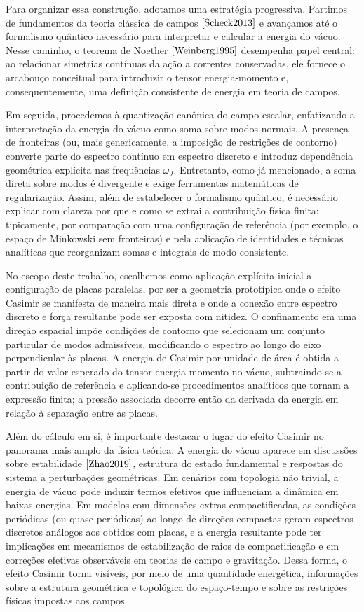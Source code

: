 Para organizar essa construção, adotamos uma estratégia progressiva. Partimos de fundamentos da teoria clássica de campos $\cite{Scheck2013}$ e avançamos até o formalismo quântico necessário para interpretar e calcular a energia do vácuo. Nesse caminho, o teorema de Noether $\cite{Weinberg1995}$ desempenha papel central: ao relacionar simetrias contínuas da ação a correntes conservadas, ele fornece o arcabouço conceitual para introduzir o tensor energia-momento e, consequentemente, uma definição consistente de energia em teoria de campos.

Em seguida, procedemos à quantização canônica do campo escalar, enfatizando a interpretação da energia do vácuo como soma sobre modos normais. A presença de fronteiras (ou, mais genericamente, a imposição de restrições de contorno) converte parte do espectro contínuo em espectro discreto e introduz dependência geométrica explícita nas frequências $\omega_J$. Entretanto, como já mencionado, a soma direta sobre modos é divergente e exige ferramentas matemáticas de regularização. Assim, além de estabelecer o formalismo quântico, é necessário explicar com clareza por que e como se extrai a contribuição física finita: tipicamente, por comparação com uma configuração de referência (por exemplo, o espaço de Minkowski sem fronteiras) e pela aplicação de identidades e técnicas analíticas que reorganizam somas e integrais de modo consistente.

No escopo deste trabalho, escolhemos como aplicação explícita inicial a configuração de placas paralelas, por ser a geometria prototípica onde o efeito Casimir se manifesta de maneira mais direta e onde a conexão entre espectro discreto e força resultante pode ser exposta com nitidez. O confinamento em uma direção espacial impõe condições de contorno que selecionam um conjunto particular de modos admissíveis, modificando o espectro ao longo do eixo perpendicular às placas. A energia de Casimir por unidade de área é obtida a partir do valor esperado do tensor energia-momento no vácuo, subtraindo-se a contribuição de referência e aplicando-se procedimentos analíticos que tornam a expressão finita; a pressão associada decorre então da derivada da energia em relação à separação entre as placas.

Além do cálculo em si, é importante destacar o lugar do efeito Casimir no panorama mais amplo da física teórica. A energia do vácuo aparece em discussões sobre estabilidade $\cite{Zhao2019}$, estrutura do estado fundamental e respostas do sistema a perturbações geométricas. Em cenários com topologia não trivial, a energia de vácuo pode induzir termos efetivos que influenciam a dinâmica em baixas energias. Em modelos com dimensões extras compactificadas, as condições periódicas (ou quase-periódicas) ao longo de direções compactas geram espectros discretos análogos aos obtidos com placas, e a energia resultante pode ter implicações em mecanismos de estabilização de raios de compactificação e em correções efetivas observáveis em teorias de campo e gravitação. Dessa forma, o efeito Casimir torna visíveis, por meio de uma quantidade energética, informações sobre a estrutura geométrica e topológica do espaço-tempo e sobre as restrições físicas impostas aos campos.

